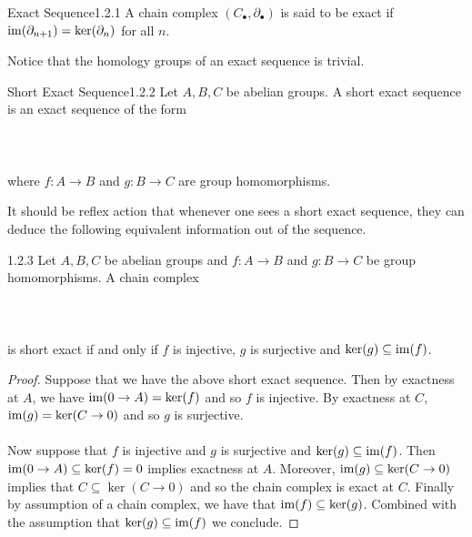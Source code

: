 \documentclass[a4paper]{article}
\begin{document}
\begin{defn}{Exact Sequence}{1.2.1} A chain complex $(C_\bullet,\partial_\bullet)$ is said to be exact if $\operatorname{im}(\partial_{n+1})=\ker(\partial_n)$ for all $n$. 
\end{defn}

Notice that the homology groups of an exact sequence is trivial. 

\begin{defn}{Short Exact Sequence}{1.2.2} Let $A,B,C$ be abelian groups. A short exact sequence is an exact sequence of the form \\~\\
\\~\\
where $f:A\to B$ and $g:B\to C$ are group homomorphisms. 
\end{defn}

It should be reflex action that whenever one sees a short exact sequence, they can deduce the following equivalent information out of the sequence. 

\begin{prp}{}{1.2.3} Let $A,B,C$ be abelian groups and $f:A\to B$ and $g:B\to C$ be group homomorphisms. A chain complex \\~\\
\\~\\
is short exact if and only if $f$ is injective, $g$ is surjective and $\ker(g)\subseteq\operatorname{im}(f)$. \tcbline
\begin{proof}
Suppose that we have the above short exact sequence. Then by exactness at $A$, we have $\operatorname{im}(0\to A)=\ker(f)$ and so $f$ is injective. By exactness at $C$, $\operatorname{im}(g)=\ker(C\to 0)$ and so $g$ is surjective. \\~\\

Now suppose that $f$ is injective and $g$ is surjective and $\ker(g)\subseteq\operatorname{im}(f)$. Then $\operatorname{im}(0\to A)\subseteq\ker(f)=0$ implies exactness at $A$. Moreover, $\operatorname{im}(g)\subseteq\ker(C\to 0)$ implies that $C\subseteq\ker(C\to 0)$ and so the chain complex is exact at $C$. Finally by assumption of a chain complex, we have that $\operatorname{im}(f)\subseteq\ker(g)$. Combined with the assumption that $\ker(g)\subseteq\operatorname{im}(f)$ we conclude. 
\end{proof}
\end{prp}
\end{document}
